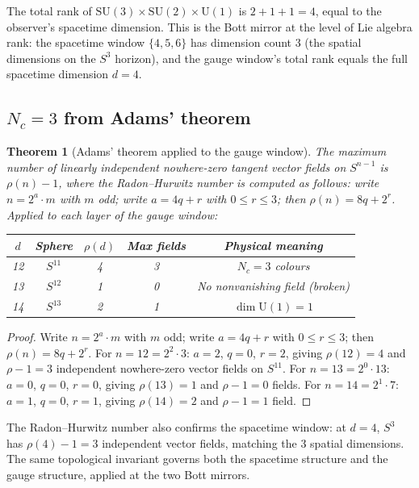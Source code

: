 \documentclass[12pt,a4paper]{article}
\newtheorem{theorem}{Theorem}[section]
\begin{document}
The total rank of $\mathrm{SU}(3)\times\mathrm{SU}(2)\times\mathrm{U}(1)$ is $2+1+1=4$,
equal to the observer's spacetime dimension. This is the Bott mirror at the level of Lie
algebra rank: the spacetime window $\{4,5,6\}$ has dimension count 3 (the spatial dimensions
on the $S^3$ horizon), and the gauge window's total rank equals the full spacetime dimension
$d=4$.

\subsection{$N_c=3$ from Adams' theorem}

\begin{theorem}[Adams' theorem applied to the gauge window]\label{thm:adams}
The maximum number of linearly independent nowhere-zero tangent vector fields on $S^{n-1}$
is $\rho(n)-1$, where the Radon--Hurwitz number is computed as follows: write $n=2^a\cdot m$
with $m$ odd; write $a=4q+r$ with $0\leq r\leq 3$; then $\rho(n)=8q+2^r$.
Applied to each layer of the gauge window:
\begin{center}
\begin{tabular}{ccccc}
\toprule
$d$ & Sphere & $\rho(d)$ & Max fields & Physical meaning \\
\midrule
12 & $S^{11}$ & 4 & 3 & $N_c=3$ colours \\
13 & $S^{12}$ & 1 & 0 & No nonvanishing field (broken) \\
14 & $S^{13}$ & 2 & 1 & $\dim\mathrm{U}(1)=1$ \\
\bottomrule
\end{tabular}
\end{center}
\end{theorem}
\begin{proof}
Write $n=2^a\cdot m$ with $m$ odd; write $a=4q+r$ with $0\leq r\leq 3$; then
$\rho(n)=8q+2^r$. For $n=12=2^2\cdot 3$: $a=2$, $q=0$, $r=2$, giving $\rho(12)=4$ and
$\rho-1=3$ independent nowhere-zero vector fields on $S^{11}$. For $n=13=2^0\cdot 13$:
$a=0$, $q=0$, $r=0$, giving $\rho(13)=1$ and $\rho-1=0$ fields. For $n=14=2^1\cdot 7$:
$a=1$, $q=0$, $r=1$, giving $\rho(14)=2$ and $\rho-1=1$ field.
\end{proof}

The Radon--Hurwitz number also confirms the spacetime window: at $d=4$, $S^3$ has
$\rho(4)-1=3$ independent vector fields, matching the 3 spatial dimensions. The same
topological invariant governs both the spacetime structure and the gauge structure, applied
at the two Bott mirrors.
\end{document}
